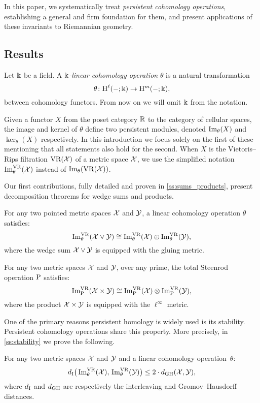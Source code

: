 In this paper, we systematically treat \textit{persistent cohomology operations}, establishing a general and firm foundation for them, and present applications of these invariants to Riemannian geometry.

\subsection*{Results}

Let \(\Bbbk\) be a field.
A \textit{\(\Bbbk\)-linear cohomology operation} \(\theta\) is a natural transformation
\[
\theta \colon \mathrm{H}^\ell(-;\Bbbk) \to \mathrm{H}^m(-;\Bbbk),
\]
between cohomology functors.
From now on we will omit \(\Bbbk\) from the notation.

Given a functor \(X\) from the poset category $\mathbb{R}$ to the category of cellular spaces, the image and kernel of \(\theta\) define two persistent modules, denoted \(\operatorname{Im}_\theta(X)\) and \(\ker_\theta(X)\) respectively.
In this introduction we focus solely on the first of these mentioning that all statements also hold for the second.
When \(X\) is the Vietoris--Rips filtration \(\mathrm{VR}(\mathcal{X})\) of a metric space \(\mathcal{X}\), we use the simplified notation \(\operatorname{Im}_\theta^{\mathrm{VR}}(\mathcal{X})\) instead of \(\operatorname{Im}_\theta(\mathrm{VR}(\mathcal{X}))\).

Our first contributions, fully detailed and proven in \cref{ss:sums_products}, present decomposition theorems for wedge sums and products.

\theorem For any two pointed metric spaces $\mathcal{X}$ and $\mathcal{Y}$, a linear cohomology operation \(\theta\) satisfies:
\[
\operatorname{Im}_\theta^{\mathrm{VR}}(\mathcal{X} \vee \mathcal{Y}) \cong \operatorname{Im}_\theta^{\mathrm{VR}}(\mathcal{X}) \oplus \operatorname{Im}_\theta^{\mathrm{VR}}(\mathcal{Y}),
\]
where the wedge sum \(\mathcal{X} \vee \mathcal{Y}\) is equipped with the gluing metric.

\theorem For any two metric spaces $\mathcal{X}$ and $\mathcal{Y}$, over any prime, the total Steenrod operation \(\mathrm{P}\) satisfies:
\[
\operatorname{Im}^{\mathrm{VR}}_{\mathrm{P}}(\mathcal{X} \times \mathcal{Y}) \cong \operatorname{Im}^{\mathrm{VR}}_{\mathrm{P}}(\mathcal{X}) \otimes \operatorname{Im}^{\mathrm{VR}}_{\mathrm{P}}(\mathcal{Y}),
\]
where the product \(\mathcal{X} \times \mathcal{Y}\) is equipped with the \(\ell^\infty\) metric.

\medskip One of the primary reasons persistent homology is widely used is its stability.
Persistent cohomology operations share this property.
More precisely, in \cref{ss:stability} we prove the following.

\theorem For any two metric spaces $\mathcal{X}$ and $\mathcal{Y}$ and a linear cohomology operation~$\theta$:
\[
d_{\mathrm{I}}\big(\operatorname{Im}_\theta^{\mathrm{VR}}(\mathcal{X}),\, \operatorname{Im}_\theta^{\mathrm{VR}}(\mathcal{Y})\big) \leq 2 \cdot d_{\mathrm{GH}}(\mathcal{X},\mathcal{Y}),
\]
where \(d_{\mathrm{I}}\) and \(d_{\mathrm{GH}}\) are respectively the interleaving and Gromov--Hausdorff distances.

